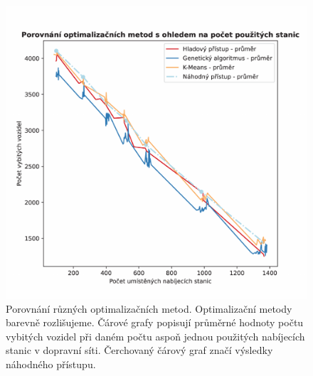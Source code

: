 \begin{figure}
    \centering
    \includegraphics[width=1\linewidth]{img/used.pdf}
    \caption{Porovnání různých optimalizačních metod. Optimalizační metody barevně
    rozlišujeme. Čárové grafy popisují průměrné hodnoty počtu vybitých vozidel při
    daném počtu aspoň jednou použitých nabíjecích stanic v dopravní síti. 
    Čerchovaný čárový graf značí výsledky náhodného přístupu.}
    \label{fig:porovnani_optimalizaci_used}
\end{figure}